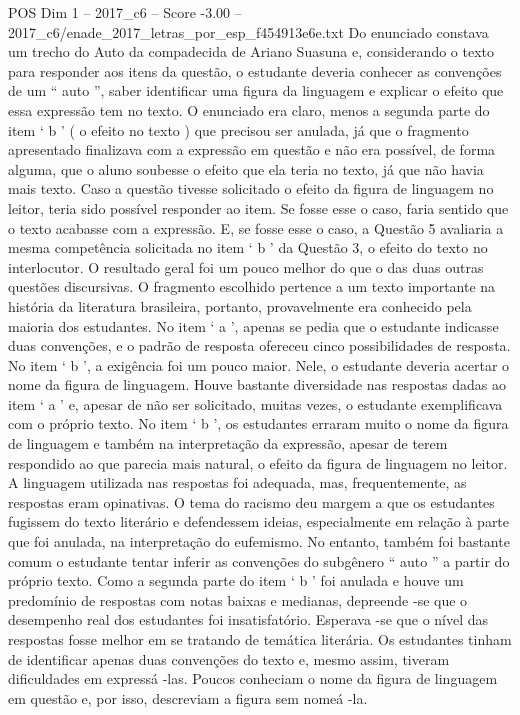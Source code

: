 \begin{textsample}{POS Dim 1 – 2017\_c6 – Score -3.00 – 2017\_c6/enade\_2017\_letras\_por\_esp\_f454913e6e.txt}
Do enunciado constava um trecho do Auto da compadecida de Ariano Suasuna e, considerando o texto para responder aos itens da questão, o estudante deveria conhecer as convenções de um “ auto ”, saber identificar uma figura da linguagem e explicar o efeito que essa expressão tem no texto.
O enunciado era claro, menos a segunda parte do item ‘ b ’ ( o efeito no texto ) que precisou ser anulada, já que o fragmento apresentado finalizava com a expressão em questão e não era possível, de forma alguma, que o aluno soubesse o efeito que ela teria no texto, já que não havia mais texto.
Caso a questão tivesse solicitado o efeito da figura de linguagem no leitor, teria sido possível responder ao item.
Se fosse esse o caso, faria sentido que o texto acabasse com a expressão.
E, se fosse esse o caso, a Questão 5 avaliaria a mesma competência solicitada no item ‘ b ’ da Questão 3, o efeito do texto no interlocutor.
O resultado geral foi um pouco melhor do que o das duas outras questões discursivas.
O fragmento escolhido pertence a um texto importante na história da literatura brasileira, portanto, provavelmente era conhecido pela maioria dos estudantes.
No item ‘ a ’, apenas se pedia que o estudante indicasse duas convenções, e o padrão de resposta ofereceu cinco possibilidades de resposta.
No item ‘ b ’, a exigência foi um pouco maior.
Nele, o estudante deveria acertar o nome da figura de linguagem.
Houve bastante diversidade nas respostas dadas ao item ‘ a ’ e, apesar de não ser solicitado, muitas vezes, o estudante exemplificava com o próprio texto.
No item ‘ b ’, os estudantes erraram muito o nome da figura de linguagem e também na interpretação da expressão, apesar de terem respondido ao que parecia mais natural, o efeito da figura de linguagem no leitor.
A linguagem utilizada nas respostas foi adequada, mas, frequentemente, as respostas eram opinativas.
O tema do racismo deu margem a que os estudantes fugissem do texto literário e defendessem ideias, especialmente em relação à parte que foi anulada, na interpretação do eufemismo.
No entanto, também foi bastante comum o estudante tentar inferir as convenções do subgênero “ auto ” a partir do próprio texto.
Como a segunda parte do item ‘ b ’ foi anulada e houve um predomínio de respostas com notas baixas e medianas, depreende -se que o desempenho real dos estudantes foi insatisfatório.
Esperava -se que o nível das respostas fosse melhor em se tratando de temática literária.
Os estudantes tinham de identificar apenas duas convenções do texto e, mesmo assim, tiveram dificuldades em expressá -las.
Poucos conheciam o nome da figura de linguagem em questão e, por isso, descreviam a figura sem nomeá -la.

\end{textsample}
